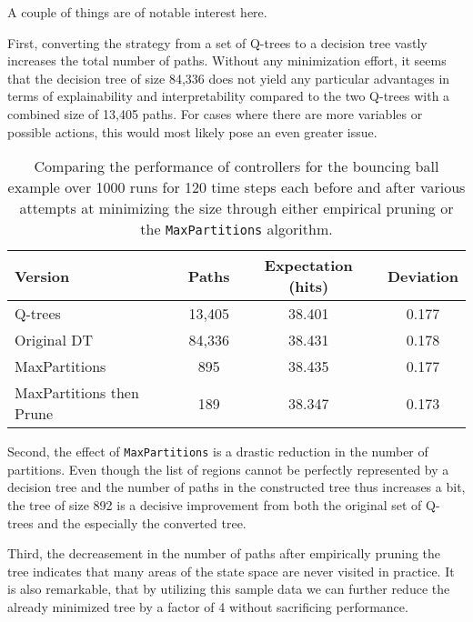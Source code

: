 A couple of things are of notable interest here.

First, converting the strategy from a set of Q-trees to a decision tree vastly
increases the total number of paths. Without any minimization effort, it seems
that the decision tree of size 84,336 does not yield any particular advantages
in terms of explainability and interpretability compared to the two Q-trees with
a combined size of 13,405 paths. For cases where there are more variables or
possible actions, this would most likely pose an even greater issue.

\begin{table}[ht]
    \centering
    \caption{%
        Comparing the performance of controllers for the bouncing ball example
        over 1000 runs for 120 time steps each before and after various attempts
        at minimizing the size through either empirical pruning or the
        \texttt{MaxPartitions} algorithm.
    }\label{tab:minimizedResults}
    \begin{tabular}[t]{lccc}
        \toprule
        Version & Paths & Expectation (hits) & Deviation \\
        \midrule
        Q-trees & 13,405 & 38.401 & 0.177 \\
        Original DT & 84,336 & 38.431 & 0.178 \\
        MaxPartitions & 895 & 38.435 & 0.177 \\
        MaxPartitions then Prune & 189 & 38.347 & 0.173 \\
        \bottomrule
    \end{tabular}
\end{table}

Second, the effect of \texttt{MaxPartitions} is a drastic reduction in the
number of partitions. Even though the list of regions cannot be perfectly
represented by a decision tree and the number of paths in the constructed tree
thus increases a bit, the tree of size 892 is a decisive improvement from both
the original set of Q-trees and the especially the converted tree.

Third, the decreasement in the number of paths after empirically pruning the
tree indicates that many areas of the state space are never visited in practice.
It is also remarkable, that by utilizing this sample data we can further reduce
the already minimized tree by a factor of 4 without sacrificing performance.

